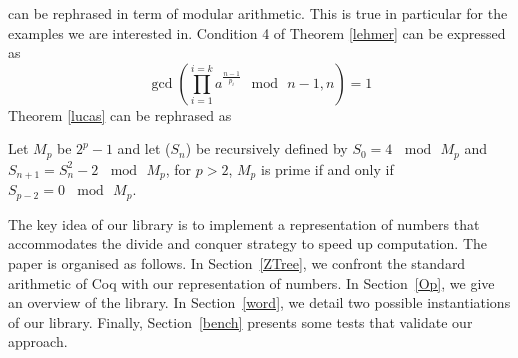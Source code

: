 can be rephrased in term of modular arithmetic. This is true in particular for the examples we are
interested in.
Condition 4 of Theorem \ref{lehmer} can be expressed as
$$
\gcd(\prod_{i=1}^{i=k}a^{\frac{n-1}{p_i}} \mod\, n -1,n) = 1
$$
Theorem \ref{lucas} can be rephrased as
\begin{theorem}
Let $M_p$ be $2^p-1$ and let  ($S_n$) be recursively defined by $S_0= 4\, \mod\, M_p$ and $S_{n+1} = S_n^2 - 2\, \mod\, M_p$,
for $p > 2$, $M_p$ is prime if and only if $S_{p-2} = 0\, \mod\, M_p $.
\end{theorem}
The key idea of our library is to implement a representation of numbers that accommodates the divide and
conquer strategy to speed up computation. The paper is organised as follows. 
In Section~\ref{ZTree}, we confront the standard arithmetic of {\sc Coq} with
our representation of numbers. In Section~\ref{Op}, we give an overview of the library.  
In Section~\ref{word}, we detail two possible instantiations of our library.
Finally, Section~\ref{bench} presents some tests that validate our approach.
 